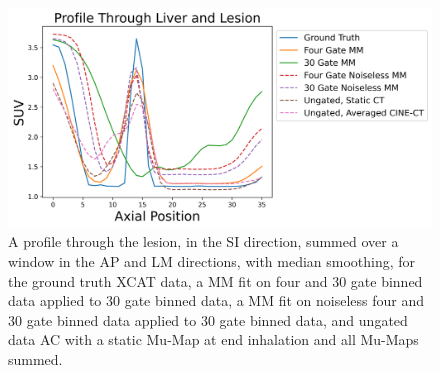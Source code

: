             \begin{figure}
                \centering
                
                \includegraphics[width=1.0\linewidth]{figures/motion_correction_2_results_1_profile.png}
                
                \captionsetup{singlelinecheck=false, justification=centering}
                \caption{
                    A profile through the lesion, in the \gls{SI} direction, summed over a window in the \gls{AP} and \gls{LM} directions, with median smoothing, for the ground truth \gls{XCAT} data, a \gls{MM} fit on four and $30$ gate binned data applied to $30$ gate binned data, a \gls{MM} fit on noiseless four and $30$ gate binned data applied to $30$ gate binned data, and ungated data \gls{AC} with a static \gls{Mu-Map} at end inhalation and all \glspl{Mu-Map} summed.
                }
                
                \label{fig:pet_ct_motion_correction_exploiting_motion_models_fit_on_coarsely_gated_data_applied_to_finely_gated_data_results_profile}
            \end{figure}
            

